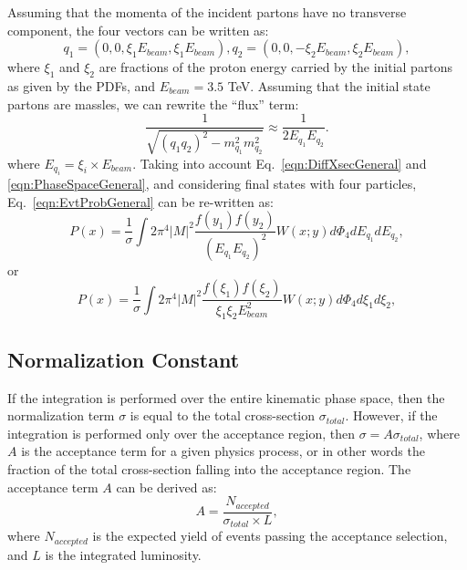 \documentclass{cmspaper}
\begin{document}
Assuming that  the momenta of the incident partons have no transverse component, the four vectors can be written as:
\begin{equation}
q_{1}=(0,0,\xi_{1}E_{beam},\xi_{1}E_{beam}),
q_{2}=(0,0,-\xi_{2}E_{beam},\xi_{2}E_{beam}),
\label{eqn:EvtProbGeneral2}  
\end{equation}
where $\xi_{1}$ and $\xi_{2}$ are fractions of the proton energy carried by the initial partons as given by the PDFs, and
$E_{beam}=3.5$ TeV. Assuming that the initial state partons are massles, we can rewrite the ``flux'' term:
\begin{equation}
\frac{1}{\sqrt{(q_{1}q_{2})^{2}-m_{q_{1}}^{2}m_{q_{2}}^{2}}} \approx \frac{1}{2 E_{q_{1}}E_{q_{2}}}.
\label{eqn:flux}  
\end{equation}
where $E_{q_{i}} = \xi_i\times E_{beam}$.  
Taking into account Eq.~\ref{eqn:DiffXsecGeneral} and \ref{eqn:PhaseSpaceGeneral}, and considering final states with four particles,
Eq.~\ref{eqn:EvtProbGeneral} can be re-written as:
\begin{equation}
P(x)=\frac{1}{ \sigma}\int 2 \pi^{4} \left| M \right|^{2} \frac{f(y_{1})f(y_{2})}{(E_{q_{1}}E_{q_{2}})^{2}}W(x;y)d\Phi_{4}dE_{q_{1}}dE_{q_{2}},
\label{eqn:EvtProbGeneral2}  
\end{equation}
or
\begin{equation}
P(x)=\frac{1}{\sigma }\int 2 \pi^{4} \left| M \right|^{2} \frac{f(\xi_{1})f(\xi_{2})}{\xi_{1}\xi_{2}E_{beam}^{2}}W(x;y)d\Phi_{4}d\xi_{1}d\xi_{2},
\label{eqn:EvtProbGeneral2}  
\end{equation}

\subsection{Normalization Constant}
If the integration is performed over the entire kinematic phase space, then the normalization term $\sigma$ is equal
to the total cross-section $\sigma_{total}$.  However, if the integration is performed only over the acceptance region,
then $\sigma=A\sigma_{total}$, where $A$ is the acceptance term for a given physics process, or in other words the fraction
of the total cross-section falling into the acceptance region.  The acceptance term $A$ can be derived as:
\begin{equation}
A=\frac{N_{accepted}}{\sigma_{total}\times L},
\label{eqn:Acceptance}  
\end{equation}
where $N_{accepted}$ is the expected yield of events passing the acceptance selection, and $L$ is the integrated luminosity.
\end{document}
